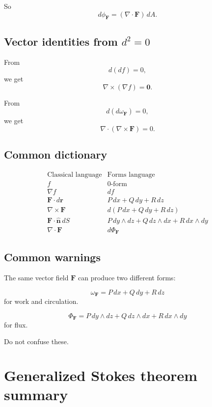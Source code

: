 So
\[
\boxed{
    d\phi_{\mathbf F}
    =
    (\nabla\cdot\mathbf F)\,dA.
}
\]

\subsection*{Vector identities from \texorpdfstring{\(d^2=0\)}{d squared equals zero}}

From
\[
    d(df)=0,
\]
we get
\[
\boxed{
    \nabla\times(\nabla f)=\mathbf 0.
}
\]

From
\[
    d(d\omega_{\mathbf F})=0,
\]
we get
\[
\boxed{
    \nabla\cdot(\nabla\times\mathbf F)=0.
}
\]

\subsection*{Common dictionary}

\[
\begin{array}{c|c}
\text{Classical language} & \text{Forms language} \\ \hline
f & 0\text{-form}\\[1mm]
\nabla f & df\\[1mm]
\mathbf F\cdot d\mathbf r & P\,dx+Q\,dy+R\,dz\\[1mm]
\nabla\times\mathbf F & d(P\,dx+Q\,dy+R\,dz)\\[1mm]
\mathbf F\cdot\widehat{\mathbf n}\,dS &
P\,dy\wedge dz+Q\,dz\wedge dx+R\,dx\wedge dy\\[1mm]
\nabla\cdot\mathbf F & d\Phi_{\mathbf F}
\end{array}
\]

\subsection*{Common warnings}

The same vector field \(\mathbf F\) can produce two different forms:

\[
\boxed{
    \omega_{\mathbf F}=P\,dx+Q\,dy+R\,dz
}
\]
for work and circulation.

\[
\boxed{
    \Phi_{\mathbf F}
    =
    P\,dy\wedge dz+Q\,dz\wedge dx+R\,dx\wedge dy
}
\]
for flux.

Do not confuse these.

\section{Generalized Stokes theorem summary}
\label{app:E.6}

